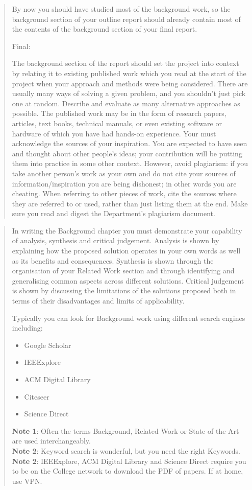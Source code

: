 \documentclass{report}
\begin{document}
\begin{quote}
By now you should have studied most of the background work, so the
background section of your outline report should already contain
most of the contents of the background section of your final
report.

Final:

The background section of the report should set the project into
context by relating it to existing published work which you read at
the start of the project when your approach and methods were being
considered. There are usually many ways of solving a given problem,
and you shouldn't just pick one at random. Describe and evaluate as
many alternative approaches as possible. The published work may be
in the form of research papers, articles, text books, technical
manuals, or even existing software or hardware of which you have
had hands-on experience. Your must acknowledge the sources of your
inspiration. You are expected to have seen and thought about other
people's ideas; your contribution will be putting them into
practice in some other context. However, avoid plagiarism: if you
take another person's work as your own and do not cite your sources
of information/inspiration you are being dishonest; in other words
you are cheating. When referring to other pieces of work, cite the
sources where they are referred to or used, rather than just
listing them at the end. Make sure you read and digest the
Department's plagiarism document.

\end{quote}
\begin{quote}
In writing the Background chapter you must demonstrate your
capability of analysis, synthesis and critical judgement. Analysis
is shown by explaining how the proposed solution operates in your
own words as well as its benefits and consequences. Synthesis is
shown through the organisation of your Related Work section and
through identifying and generalising common aspects across
different solutions. Critical judgement is shown by discussing the
limitations of the solutions proposed both in terms of their
disadvantages and limits of applicability.

Typically you can look for Background work using different search
engines including:

\begin{itemize}
\item
  Google Scholar
\item
  IEEExplore
\item
  ACM Digital Library
\item
  Citeseer
\item
  Science Direct
\end{itemize}
\textbf{Note 1}: Often the terms Background, Related Work or State
of the Art are used interchangeably.\\\textbf{Note 2}: Keyword
search is wonderful, but you need the right
Keywords.\\\textbf{Note 2}: IEEExplore, ACM Digital Library and
Science Direct require you to be on the College network to download
the PDF of papers. If at home, use VPN.

\end{quote}
\end{document}
